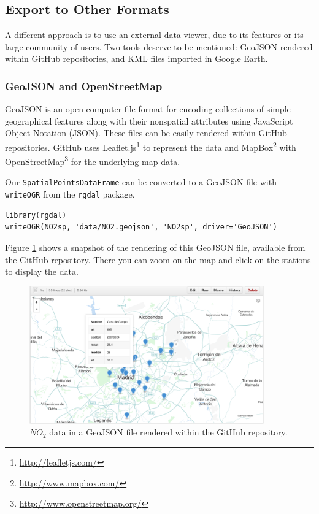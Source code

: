 \documentclass[smallroyalvopaper]{memoir}
\begin{document}
\subsection{Export to Other Formats}
\label{sec-1-6}

A different approach is to use an external data viewer, due to its
features or its large community of users. Two tools deserve to be
mentioned: GeoJSON rendered within GitHub repositories, and KML files
imported in Google Earth\texttrademark.

\subsubsection{GeoJSON and OpenStreetMap}
\label{sec-1-6-1}
GeoJSON is an open computer file format for encoding collections of
simple geographical features along with their nonspatial attributes
using JavaScript Object Notation (JSON). These files can be easily
rendered within GitHub repositories. GitHub uses Leaflet.js\footnote{\url{http://leafletjs.com/}} to
represent the data and MapBox\footnote{\url{http://www.mapbox.com/}} with OpenStreetMap\footnote{\url{http://www.openstreetmap.org/}} for the
underlying map data.

Our \texttt{SpatialPointsDataFrame} can be converted to a GeoJSON file with
\texttt{writeOGR} from the \texttt{rgdal} package. 


\lstset{language=R,numbers=none}
\begin{lstlisting}
library(rgdal)
writeOGR(NO2sp, 'data/NO2.geojson', 'NO2sp', driver='GeoJSON')
\end{lstlisting}

Figure \ref{fig:geojson} shows a snapshot of the rendering of this
GeoJSON file, available from the GitHub repository. There you can zoom
on the map and click on the stations to display the data.

\begin{figure}
\includegraphics[width=0.9\textwidth]{figs/geojson.png}
\caption{\label{fig:geojson}$NO_2$ data in a GeoJSON file rendered within the GitHub repository.}
\end{figure}
\end{document}

